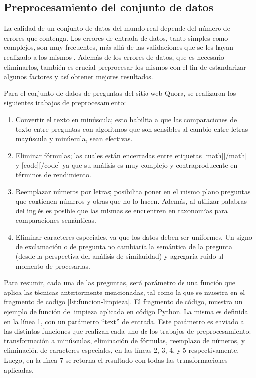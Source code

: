 \subsection{Preprocesamiento del conjunto de datos}

La calidad de un conjunto de datos del mundo real depende del número de errores que contenga. Los errores de entrada de datos, tanto simples como complejos, son muy frecuentes, más allá de las validaciones que se les hayan realizado a los mismos \citep{maletic2000data}. Además de los errores de datos, que es necesario eliminarlos, también es crucial preprocesar los mismos con el fin de estandarizar algunos factores y así obtener mejores resultados.

\bigskip Para el conjunto de datos de preguntas del sitio web Quora, se realizaron los siguientes trabajos de preprocesamiento:

\begin{enumerate}
	\item Convertir el texto en minúscula; esto habilita a que las comparaciones de texto entre preguntas con algoritmos que son sensibles al cambio entre letras mayúscula y minúscula, sean efectivas.
	\item Eliminar fórmulas; las cuales están encerradas entre etiquetas [math][/math] y [code][/code] ya que su análisis es muy complejo y contraproducente en términos de rendimiento.
	\item Reemplazar números por letras; posibilita poner en el mismo plano preguntas que contienen números y otras que no lo hacen. Además, al utilizar palabras del inglés es posible que las mismas se encuentren en taxonomías para comparaciones semánticas.
	\item Eliminar caracteres especiales, ya que los datos deben ser uniformes. Un signo de exclamación o de pregunta no cambiaría la semántica de la pregunta (desde la perspectiva del análisis de similaridad) y agregaría ruido al momento de procesarlas.
\end{enumerate}

Para resumir, cada una de las preguntas, será parámetro de una función que aplica las técnicas anteriormente mencionadas, tal como la que se muestra en el fragmento de codigo \ref{lst:funcion-limpieza}. El fragmento de código, muestra un ejemplo de función de limpieza aplicada en código Python. La misma es definida en la línea 1, con un parámetro “text” de entrada. Este parámetro es enviado a las distintas funciones que realizan cada uno de los trabajos de preprocesamiento: transformación a minúsculas, eliminación de fórmulas, reemplazo de números, y eliminación de caracteres especiales, en las líneas 2, 3, 4, y 5 respectivamente. Luego, en la línea 7 se retorna el resultado con todas las transformaciones aplicadas.

